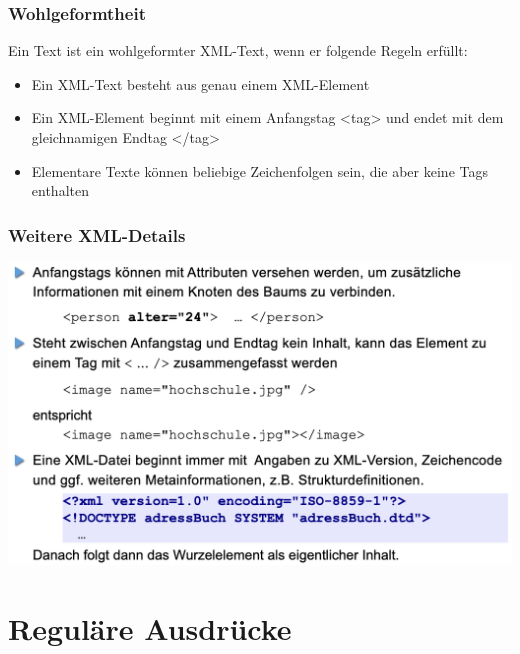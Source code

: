 \documentclass{scrreprt}
\begin{document}
\subsection{Wohlgeformtheit}
Ein Text ist ein wohlgeformter XML-Text, wenn er folgende Regeln erfüllt:
\begin{itemize}
    \item Ein XML-Text besteht aus genau einem XML-Element
    \item Ein XML-Element beginnt mit einem Anfangstag <tag> und endet mit dem gleichnamigen Endtag </tag>
    \item Elementare Texte können beliebige Zeichenfolgen sein, die aber keine Tags enthalten
\end{itemize}
\subsection{Weitere XML-Details}
\includegraphics[width=1\textwidth]{"graphics/XML-tag"}
\pagebreak
\chapter{Reguläre Ausdrücke}
\end{document}
